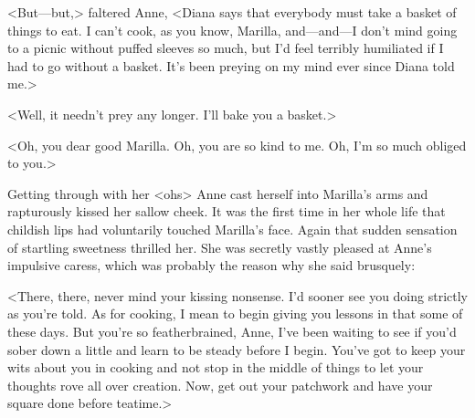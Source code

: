 <But—but,> faltered Anne, <Diana says that everybody must take a basket of things to eat. I can't cook, as you know, Marilla, and—and—I don't mind going to a picnic without puffed sleeves so much, but I'd feel terribly humiliated if I had to go without a basket. It's been preying on my mind ever since Diana told me.>

<Well, it needn't prey any longer. I'll bake you a basket.>

<Oh, you dear good Marilla. Oh, you are so kind to me. Oh, I'm so much obliged to you.>

Getting through with her <ohs> Anne cast herself into Marilla's arms and rapturously kissed her sallow cheek. It was the first time in her whole life that childish lips had voluntarily touched Marilla's face. Again that sudden sensation of startling sweetness thrilled her. She was secretly vastly pleased at Anne's impulsive caress, which was probably the reason why she said brusquely:

<There, there, never mind your kissing nonsense. I'd sooner see you doing strictly as you're told. As for cooking, I mean to begin giving you lessons in that some of these days. But you're so featherbrained, Anne, I've been waiting to see if you'd sober down a little and learn to be steady before I begin. You've got to keep your wits about you in cooking and not stop in the middle of things to let your thoughts rove all over creation. Now, get out your patchwork and have your square done before teatime.>

